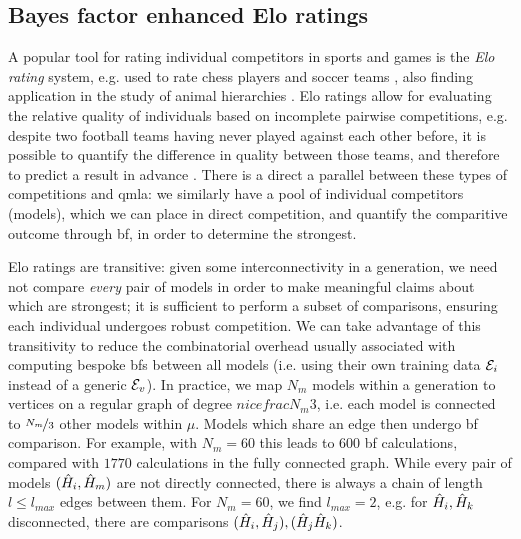 \subsection{Bayes factor enhanced Elo ratings}\label{sec:elo}
A popular tool for rating individual competitors in sports and games is the \emph{\gls{Elo rating}} system, 
    e.g. used to rate chess players and soccer teams \cite{elo1978rating, fifa_elo}, 
    also finding application in the study of animal hierarchies \cite{neumann2011assessing}. 
\glspl{Elo rating} allow for evaluating the relative quality of individuals 
    based on incomplete pairwise competitions, 
    e.g. despite two football teams having never played against each other before, 
    it is possible to quantify the difference in quality between those teams, 
    and therefore to predict a result in advance \cite{hvattum2010using}. 
There is a direct a parallel between these types of competitions and \gls{qmla}:
    we similarly have a pool of individual competitors (models), 
    which we can place in direct competition, 
    and quantify the comparitive outcome through \gls{bf}, 
    in order to determine the strongest. 

\par 
\glspl{Elo rating} are transitive: given some interconnectivity in a generation, 
    we need not compare \emph{every} pair of models in order to 
    make meaningful claims about which are strongest;
    it is sufficient to perform a subset of comparisons, 
    ensuring each individual undergoes robust competition.
We can take advantage of this transitivity to reduce the combinatorial overhead 
    usually associated with computing bespoke \glspl{bf} between all models 
    (i.e. using their own training data ${ \mathcal{E} }_i$ instead of a generic 
    ${ \mathcal{E} }_v$).
In practice, we map $N_m$ models within a generation to vertices on a regular graph
    of degree $nicefrac{N_m}{3}$, i.e. each model is connected to $\nicefrac{N_m}{3}$ 
    other models within $\mu$. 
Models which share an edge then undergo \gls{bf} comparison. 
For example, with $N_m=60$ this leads to $600$ \gls{bf} calculations, 
    compared with $1770$ calculations in the fully connected graph. 
While every pair of models $(\hat{H}_i, \hat{H}_{m})$ are not directly connected, 
    there is always a chain of length $l \leq l_{max}$ edges between them.
For $N_m=60$, we find $l_{max}=2$, 
    e.g. for $\hat{H}_i, \hat{H}_k$ disconnected, there are comparisons $(\hat{H}_i, \hat{H}_j), (\hat{H}_j \hat{H}_k)$. 
    
\par 

